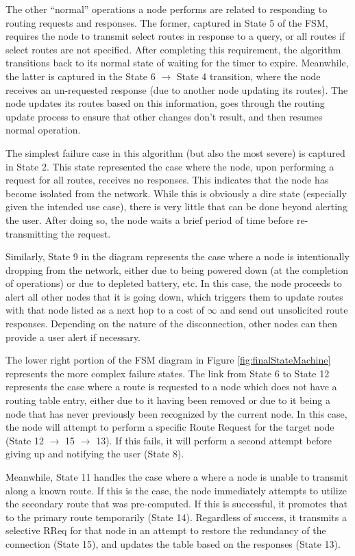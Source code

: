 The other ``normal'' operations a node performs are related to responding to routing requests and responses. The former, captured in State 5 of the FSM, requires the node to transmit select routes in response to a query, or all routes if select routes are not specified.  After completing this requirement, the algorithm transitions back to its normal state of waiting for the timer to expire. Meanwhile, the latter is captured in the State 6 $\rightarrow$ State 4 transition, where the node receives an un-requested response (due to another node updating its routes). The node updates its routes based on this information, goes through the routing update process to ensure that other changes don't result, and then resumes normal operation.

The simplest failure case in this algorithm (but also the most severe) is captured in State 2. This state represented the case where the node, upon performing a request for all routes, receives no responses. This indicates that the node has become isolated from the network. While this is obviously a dire state (especially given the intended use case), there is very little that can be done beyond alerting the user. After doing so, the node waits a brief period of time before re-transmitting the request. 

Similarly, State 9 in the diagram represents the case where a node is intentionally dropping from the network, either due to being powered down (at the completion of operations) or due to depleted battery, etc. In this case, the node proceeds to alert all other nodes that it is going down, which triggers them to update routes with that node listed as a next hop to a cost of $\infty$ and send out unsolicited route responses. Depending on the nature of the disconnection, other nodes can then provide a user alert if necessary. 

The lower right portion of the FSM diagram in Figure \ref{fig:finalStateMachine} represents the more complex failure states. The link from State 6 to State 12 represents the case where a route is requested to a node which does not have a routing table entry, either due to it having been removed or due to it being a node that has never previously been recognized by the current node. In this case, the node will attempt to perform a specific Route Request for the target node (State 12 $\rightarrow$ 15 $\rightarrow$ 13). If this fails, it will perform a second attempt before giving up and notifying the user (State 8).

Meanwhile, State 11 handles the case where a where a node is unable to transmit along a known route. If this is the case, the node immediately attempts to utilize the secondary route that was pre-computed. If this is successful, it promotes that to the primary route temporarily (State 14). Regardless of success, it transmits a selective RReq for that node in an attempt to restore the redundancy of the connection (State 15), and updates the table based on the responses (State 13).

